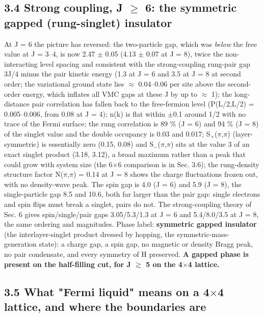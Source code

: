 \documentclass[10pt]{article}
\begin{document}
\subsection*{3.4 Strong coupling, J $\ge$ 6: the symmetric gapped (rung-singlet) insulator}

At J = 6 the picture has reversed: the two-particle gap, which was \emph{below} the free value at J = 3--4, is now 2.47 $\pm$ 0.05 (4.13 $\pm$ 0.07 at J = 8), twice the non-interacting level spacing and consistent with the strong-coupling rung-pair gap 3J/4 minus the pair kinetic energy (1.3 at J = 6 and 3.5 at J = 8 at second order; the variational ground state lies $\approx$ 0.04--0.06 per site above the second-order energy, which inflates all VMC gaps at these J by up to $\approx$ 1); the long-distance pair correlation has fallen back to the free-fermion level (P(L/2,L/2) = 0.005--0.006, from 0.08 at J = 4); n(k) is flat within $\pm$0.1 around 1/2 with no trace of the Fermi surface; the rung correlation is 89 \% (J = 6) and 94 \% (J = 8) of the singlet value and the double occupancy is 0.03 and 0.017; S$_+$($\pi$,$\pi$) (layer-symmetric) is essentially zero (0.15, 0.08) and S$_-$($\pi$,$\pi$) sits at the value 3 of an exact singlet product (3.18, 3.12), a broad maximum rather than a peak that could grow with system size (the 6$\times$6 comparison is in Sec. 3.6); the rung-density structure factor N($\pi$,$\pi$) = 0.14 at J = 8 shows the charge fluctuations frozen out, with no density-wave peak. The spin gap is 4.0 (J = 6) and 5.9 (J = 8), the single-particle gap 8.5 and 10.6, both far larger than the pair gap: single electrons and spin flips must break a singlet, pairs do not. The strong-coupling theory of Sec. 6 gives spin/single/pair gaps 3.05/5.3/1.3 at J = 6 and 5.4/8.0/3.5 at J = 8, the same ordering and magnitudes. Phase label: \textbf{symmetric gapped insulator} (the interlayer-singlet product dressed by hopping, the symmetric-mass-generation state): a charge gap, a spin gap, no magnetic or density Bragg peak, no pair condensate, and every symmetry of H preserved. \textbf{A gapped phase is present on the half-filling cut, for J $\gtrsim$ 5 on the 4$\times$4 lattice.}

\subsection*{3.5 What "Fermi liquid" means on a 4$\times$4 lattice, and where the boundaries are}
\end{document}

